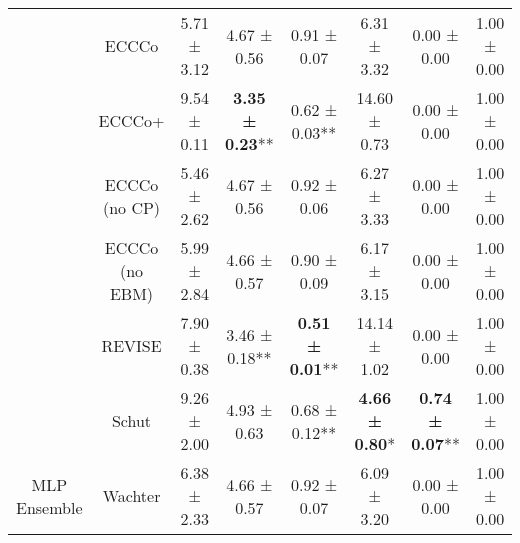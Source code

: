\begin{table}
{\begin{tabular}[t]{cccccccc}
 & ECCCo & 5.71 ± 3.12\hphantom{*}\hphantom{*} & 4.67 ± 0.56\hphantom{*}\hphantom{*} & 0.91 ± 0.07\hphantom{*}\hphantom{*} & 6.31 ± 3.32\hphantom{*}\hphantom{*} & 0.00 ± 0.00\hphantom{*}\hphantom{*} & 1.00 ± 0.00\hphantom{*}\hphantom{*}\\

 & ECCCo+ & 9.54 ± 0.11\hphantom{*}\hphantom{*} & \textbf{3.35 ± 0.23}** & 0.62 ± 0.03** & 14.60 ± 0.73\hphantom{*}\hphantom{*} & 0.00 ± 0.00\hphantom{*}\hphantom{*} & 1.00 ± 0.00\hphantom{*}\hphantom{*}\\

 & ECCCo (no CP) & 5.46 ± 2.62\hphantom{*}\hphantom{*} & 4.67 ± 0.56\hphantom{*}\hphantom{*} & 0.92 ± 0.06\hphantom{*}\hphantom{*} & 6.27 ± 3.33\hphantom{*}\hphantom{*} & 0.00 ± 0.00\hphantom{*}\hphantom{*} & 1.00 ± 0.00\hphantom{*}\hphantom{*}\\

 & ECCCo (no EBM) & 5.99 ± 2.84\hphantom{*}\hphantom{*} & 4.66 ± 0.57\hphantom{*}\hphantom{*} & 0.90 ± 0.09\hphantom{*}\hphantom{*} & 6.17 ± 3.15\hphantom{*}\hphantom{*} & 0.00 ± 0.00\hphantom{*}\hphantom{*} & 1.00 ± 0.00\hphantom{*}\hphantom{*}\\

 & REVISE & 7.90 ± 0.38\hphantom{*}\hphantom{*} & 3.46 ± 0.18** & \textbf{0.51 ± 0.01}** & 14.14 ± 1.02\hphantom{*}\hphantom{*} & 0.00 ± 0.00\hphantom{*}\hphantom{*} & 1.00 ± 0.00\hphantom{*}\hphantom{*}\\

 & Schut & 9.26 ± 2.00\hphantom{*}\hphantom{*} & 4.93 ± 0.63\hphantom{*}\hphantom{*} & 0.68 ± 0.12** & \textbf{4.66 ± 0.80}*\hphantom{*} & \textbf{0.74 ± 0.07}** & 1.00 ± 0.00\hphantom{*}\hphantom{*}\\

\multirow[t]{-10}{*}{\centering\arraybackslash MLP Ensemble} & Wachter & 6.38 ± 2.33\hphantom{*}\hphantom{*} & 4.66 ± 0.57\hphantom{*}\hphantom{*} & 0.92 ± 0.07\hphantom{*}\hphantom{*} & 6.09 ± 3.20\hphantom{*}\hphantom{*} & 0.00 ± 0.00\hphantom{*}\hphantom{*} & 1.00 ± 0.00\hphantom{*}\hphantom{*}\\
\bottomrule
\end{tabular}}
\end{table}
